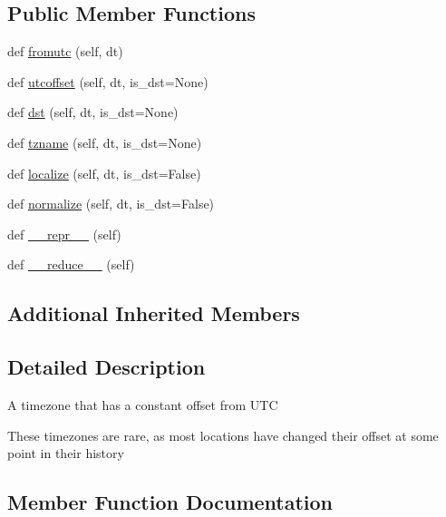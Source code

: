 \subsection*{Public Member Functions}
\begin{DoxyCompactItemize}
\item 
def \hyperlink{classpytz_1_1tzinfo_1_1StaticTzInfo_a19c329491d2cbda055eb0861d5c367b3}{fromutc} (self, dt)
\item 
def \hyperlink{classpytz_1_1tzinfo_1_1StaticTzInfo_a0020ea03d226193d2de99cfb617596fd}{utcoffset} (self, dt, is\+\_\+dst=None)
\item 
def \hyperlink{classpytz_1_1tzinfo_1_1StaticTzInfo_a93061e3544a9fc192b0f402ca2efa85a}{dst} (self, dt, is\+\_\+dst=None)
\item 
def \hyperlink{classpytz_1_1tzinfo_1_1StaticTzInfo_a721362197fd11f3389792443bffe6ded}{tzname} (self, dt, is\+\_\+dst=None)
\item 
def \hyperlink{classpytz_1_1tzinfo_1_1StaticTzInfo_a496aa3c68f9a79d26d62826923489fb8}{localize} (self, dt, is\+\_\+dst=False)
\item 
def \hyperlink{classpytz_1_1tzinfo_1_1StaticTzInfo_ab212a5ffb525fe66527c014149a86f33}{normalize} (self, dt, is\+\_\+dst=False)
\item 
def \hyperlink{classpytz_1_1tzinfo_1_1StaticTzInfo_ab895b95a15561e921ebf033520dec164}{\+\_\+\+\_\+repr\+\_\+\+\_\+} (self)
\item 
def \hyperlink{classpytz_1_1tzinfo_1_1StaticTzInfo_ae390064d45afd0eee15b7eea79b2854b}{\+\_\+\+\_\+reduce\+\_\+\+\_\+} (self)
\end{DoxyCompactItemize}
\subsection*{Additional Inherited Members}


\subsection{Detailed Description}
\begin{DoxyVerb}A timezone that has a constant offset from UTC

These timezones are rare, as most locations have changed their
offset at some point in their history
\end{DoxyVerb}
 

\subsection{Member Function Documentation}
\mbox{\label{classpytz_1_1tzinfo_1_1StaticTzInfo_ae390064d45afd0eee15b7eea79b2854b}} 

